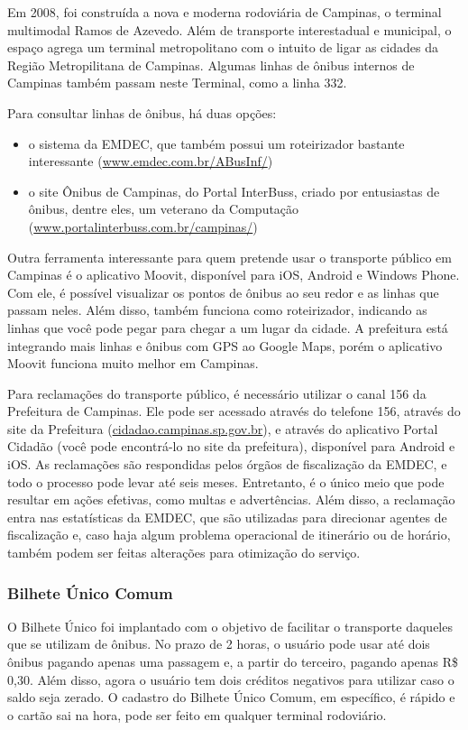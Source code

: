 Em 2008, foi construída a nova e moderna rodoviária de Campinas, o terminal
multimodal Ramos de Azevedo. Além de transporte interestadual e municipal, o
espaço agrega um terminal metropolitano com o intuito de ligar as cidades da
Região Metropilitana de Campinas. Algumas linhas de ônibus internos de Campinas
também passam neste Terminal, como a linha 332.

Para consultar linhas de ônibus, há duas opções:
\begin{itemize}
  \item o sistema da EMDEC, que também possui um roteirizador bastante
        interessante (\url{www.emdec.com.br/ABusInf/})
  \item o site Ônibus de Campinas, do Portal InterBuss, criado por entusiastas
        de ônibus, dentre eles, um veterano da Computação
(\url{www.portalinterbuss.com.br/campinas/})
\end{itemize}

Outra ferramenta interessante para quem pretende usar o transporte público em
Campinas é o aplicativo Moovit, disponível para iOS, Android e Windows
Phone. Com ele, é possível visualizar os pontos de ônibus ao seu redor e as
linhas que passam neles. Além disso, também funciona como roteirizador,
indicando as linhas que você pode pegar para chegar a um lugar da cidade. A
prefeitura está integrando mais linhas e ônibus com GPS ao Google Maps, porém
o aplicativo Moovit funciona muito melhor em Campinas.

Para reclamações do transporte público, é necessário utilizar o canal 156 da
Prefeitura de Campinas. Ele pode ser acessado através do telefone 156, através
do site da Prefeitura (\url{cidadao.campinas.sp.gov.br}), e através do
aplicativo Portal Cidadão (você pode encontrá-lo no site da prefeitura),
disponível para Android e iOS. As reclamações são respondidas pelos órgãos de
fiscalização da EMDEC, e todo o processo pode levar até seis meses. Entretanto,
é o único meio que pode resultar em ações efetivas, como multas e advertências.
Além disso, a reclamação entra nas estatísticas da EMDEC, que são utilizadas
para direcionar agentes de fiscalização e, caso haja algum problema operacional
de itinerário ou de horário, também podem ser feitas alterações para otimização
do serviço.

\subsubsection{Bilhete Único Comum}

O Bilhete Único foi implantado com o objetivo de facilitar o transporte
daqueles que se utilizam de ônibus. No prazo de 2 horas, o usuário pode usar
até dois ônibus pagando apenas uma passagem e, a partir do terceiro, pagando
apenas R\$ 0,30. Além disso, agora o usuário tem dois créditos negativos para
utilizar caso o saldo seja zerado. O cadastro do Bilhete Único Comum, em
específico, é rápido e o cartão sai na hora, pode ser feito em qualquer
terminal rodoviário.


